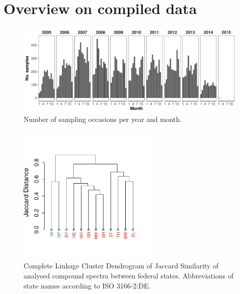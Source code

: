 \FloatBarrier

\clearpage
\section{Overview on compiled data}



\clearpage


\begin{landscape}
\begin{figure}[h]
	\centering
	\includegraphics[width = \textheight]{appendix/smallstreams/one/temporal}
	\caption{Number of sampling occasions per year and month.}
	\label{fig:temporal}
\end{figure}
\end{landscape}

\clearpage


\begin{figure}[h]
	\centering
	\vspace{-1.5cm}
	\includegraphics[width = 0.6\textwidth]{appendix/smallstreams/one/varclus}
	\vspace{-1cm}
	\caption[Complete Linkage Cluster Dendrogram of Jaccard Similarity of analysed compound spectra between federal states.]{Complete Linkage Cluster Dendrogram of Jaccard Similarity of analysed compound spectra between federal states. Abbreviations of state names according to ISO 3166-2:DE.}
	\label{fig:varclus}
\end{figure}




